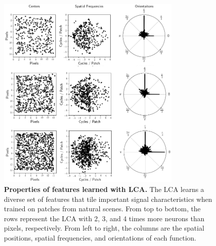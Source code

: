 \begin{figure}[ht]
    \centering
    \includegraphics[width=0.8\textwidth]{figures/lca_fits_loc_freq_orien.png}
    \caption{\textbf{Properties of features learned with LCA.} The LCA learns a diverse set of features that tile important signal characteristics when trained on patches from natural scenes. From top to bottom, the rows represent the LCA with 2, 3, and 4 times more neurons than pixels, respectively. From left to right, the columns are the spatial positions, spatial frequencies, and orientations of each function.}
    \label{fig:ch2_lca_overcompleteness_tiling}
\end{figure}

